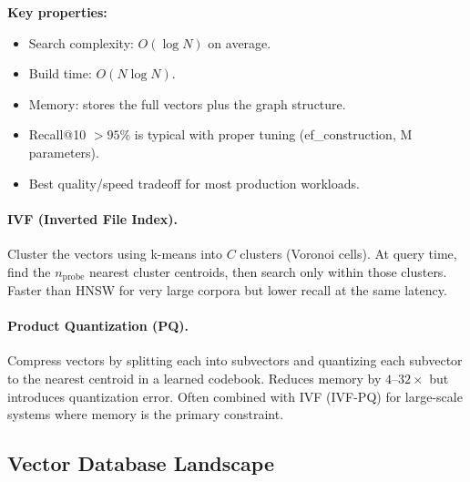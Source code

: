 \textbf{Key properties:}
\begin{itemize}
    \item Search complexity: $O(\log N)$ on average.
    \item Build time: $O(N \log N)$.
    \item Memory: stores the full vectors plus the graph structure.
    \item Recall@10 $> 95$\% is typical with proper tuning (ef\_construction,
          M parameters).
    \item Best quality/speed tradeoff for most production workloads.
\end{itemize}

\paragraph{IVF (Inverted File Index).}
Cluster the vectors using k-means into $C$ clusters (Voronoi cells).
At query time, find the $n_{\text{probe}}$ nearest cluster centroids, then
search only within those clusters.  Faster than HNSW for very large corpora
but lower recall at the same latency.

\paragraph{Product Quantization (PQ).}
Compress vectors by splitting each into subvectors and quantizing each
subvector to the nearest centroid in a learned codebook.  Reduces memory by
$4$--$32\times$ but introduces quantization error.  Often combined with IVF
(IVF-PQ) for large-scale systems where memory is the primary constraint.

\subsection{Vector Database Landscape}

